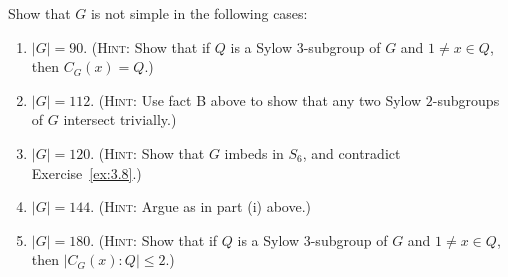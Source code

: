 \documentclass[../Odyssey_Project.tex]{subfiles}
\begin{document}
\begin{exercise}
\label{ex:7.12}
Show that $G$ is not simple in the following cases:
\begin{enumerate}
    \item[(a)] $|G| = 90$. (\textsc{Hint}: Show that if $Q$ is a Sylow $3$-subgroup of $G$ and $1 \neq x \in Q$, then $C_G(x) = Q$.)
    \item[(b)] $|G| = 112$. (\textsc{Hint}: Use fact B above to show that any two Sylow $2$-subgroups of $G$ intersect trivially.)
    \item[(c)] $|G| = 120$. (\textsc{Hint}: Show that $G$ imbeds in $S_6$, and contradict Exercise~\ref{ex:3.8}.)
    \item[(d)] $|G| = 144$. (\textsc{Hint}: Argue as in part (i) above.)
    \item[(e)] $|G| = 180$. (\textsc{Hint}: Show that if $Q$ is a Sylow $3$-subgroup of $G$ and $1 \neq x \in Q$, then $|C_G(x) : Q| \leq 2$.)
\end{enumerate}
\end{exercise}
\end{document}
